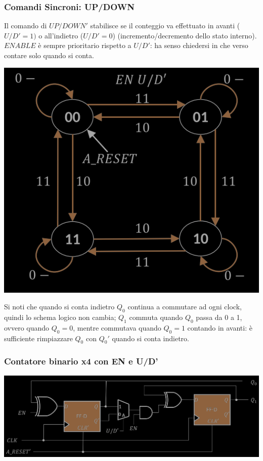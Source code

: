 \documentclass{article}
\begin{document}
\subsubsection{Comandi Sincroni: UP/DOWN}
Il comando di $UP/DOWN'$ stabilisce se il conteggio va effettuato in avanti ($U/D'=1)$ o all'indietro ($U/D'=0$) (incremento/decremento dello stato interno).\\
$ENABLE$ è sempre prioritario rispetto a $U/D'$: ha senso chiedersi in che verso contare solo quando si conta.
\begin{center}
    \includegraphics[scale=0.4]{up down.png}
\end{center}
Si noti che quando si conta indietro $Q_0$ continua a commutare ad ogni clock, quindi lo schema logico non cambia; $Q_1$ commuta quando $Q_0$ passa da 0 a 1, ovvero quando $Q_0=0$, mentre commutava quando $Q_0=1$ contando in avanti: è sufficiente rimpiazzare $Q_0$ con $Q_0'$ quando si conta indietro.

\subsubsection*{Contatore binario x4 con EN e U/D'}
\begin{center}
    \includegraphics[scale=0.4]{contatore binario en ud.png}
\end{center}
\end{document}
